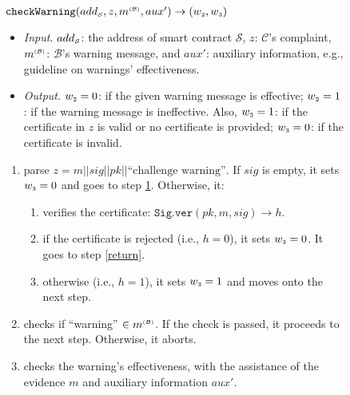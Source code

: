 \begin{figure}[!htbp]
\setlength{\fboxsep}{.9pt}
\begin{center}
    \begin{tcolorbox}[enhanced,width=5.5in, height=50mm,
    drop fuzzy shadow southwest,
    colframe=black,colback=white]
    \small{
    \vspace{-2.5mm}
 \underline{$\mathtt{checkWarning}(add_{\scriptscriptstyle\mathcal{S}}, z, m^{\scriptscriptstyle\mathcal{(B)}},  aux')\rightarrow (w_{\scriptscriptstyle 2},  w_{\scriptscriptstyle 3})$}\\
%
\vspace{-2.2mm}
\begin{itemize}
%
\item \noindent\textit{Input}. $add_{\scriptscriptstyle\mathcal{S}}$: the address of smart contract $\mathcal{S}$, $z$:  $\mathcal{C}$'s complaint, $m^{\scriptscriptstyle\mathcal{(B)}}$:  $\mathcal{B}$'s warning message,  and $aux'$: auxiliary information, e.g., guideline on warnings' effectiveness. 
%
\item\noindent\textit{Output}. $w_{\scriptscriptstyle 2}=0$: if the given warning message is effective; $w_{\scriptscriptstyle 2}=1$: if the  warning message is ineffective. Also, $w_{\scriptscriptstyle 3}=1$: if the certificate in $z$ is valid or no certificate is provided; $ w_{\scriptscriptstyle 3}=0$: if the certificate is invalid. 
%
\end{itemize}
%
\begin{enumerate}
%
\item parse $z= m||sig||pk||\text{``challenge warning''}$. If  $sig$ is  empty,  it  sets $w_{\scriptscriptstyle 3}=0$ and goes to  step \ref{check-m}. Otherwise, it:
%
\begin{enumerate} 
%
\item verifies the certificate: $\mathtt{Sig.ver}(pk, m, sig)\rightarrow h$. 
%
\item if  the certificate is rejected (i.e., $h=0$),  it sets $w_{\scriptscriptstyle 3}=0$. It  goes to step \ref{return}. 
%
\item otherwise (i.e., $h=1$), it sets $w_{\scriptscriptstyle 3}=1$ and moves onto the next step. 
\end{enumerate}
%
%
\item\label{check-m} checks if ``warning'' $\in m^{\scriptscriptstyle\mathcal{(B)}}$.  If the check is passed, it proceeds to the next step. Otherwise, it aborts. 
%
\item checks the warning's effectiveness, with the assistance of the evidence $m$ and auxiliary information $aux'$. 

\end{enumerate}}
\end{tcolorbox}
\end{center}
\end{figure}
